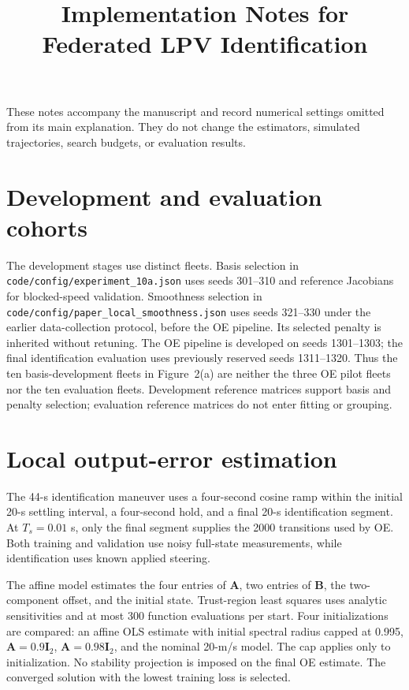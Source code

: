 \documentclass[10pt]{article}
\title{Implementation Notes for Federated LPV Identification}
\author{}
\date{}
\newcommand{\focusrev}[1]{\textcolor{focusedrevision}{#1}}
\begin{document}
\maketitle
These notes accompany the manuscript and record numerical settings omitted
from its main explanation. They do not change the estimators, simulated
trajectories, search budgets, or evaluation results.

\section{\focusrev{Development and evaluation cohorts}}
\focusrev{The development stages use distinct fleets. Basis selection in
\nolinkurl{code/config/experiment_10a.json} uses seeds 301--310 and reference
Jacobians for blocked-speed validation. Smoothness selection in
\nolinkurl{code/config/paper_local_smoothness.json} uses seeds 321--330 under
the earlier data-collection protocol, before the OE pipeline. Its selected
penalty is inherited without retuning. The OE pipeline is developed on
seeds 1301--1303; the final identification evaluation uses previously reserved
seeds 1311--1320. Thus the ten basis-development fleets in Figure~2(a) are
neither the three OE pilot fleets nor the ten evaluation fleets. Development
reference matrices support basis and penalty selection; evaluation reference
matrices do not enter fitting or grouping.}

\section{Local output-error estimation}
The 44-s identification maneuver uses a four-second cosine ramp within the
initial 20-s settling interval, a four-second hold, and a final 20-s
identification segment. At $T_s=0.01$ s, only the final segment supplies the
2000 transitions used by OE. Both training and validation use noisy full-state
measurements, while identification uses known applied steering.

The affine model estimates the four entries of $\boldsymbol A$, two entries
of $\boldsymbol B$, the two-component offset, and the initial state.
Trust-region least squares uses analytic sensitivities and at most 300
function evaluations per start. Four initializations are compared: an affine
OLS estimate with initial spectral radius capped at 0.995,
$\boldsymbol A=0.9\boldsymbol I_2$, $\boldsymbol A=0.98\boldsymbol I_2$,
and the nominal 20-m/s model. The cap applies only to initialization.
No stability projection is imposed on the final OE estimate. The converged
solution with the lowest training loss is selected.
\end{document}
